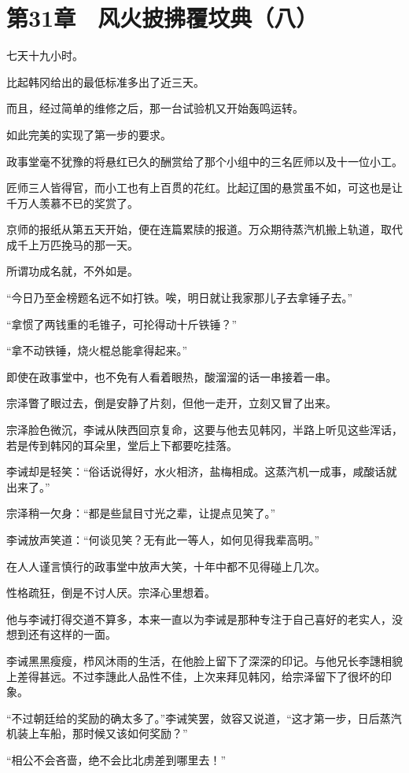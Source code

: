\section{第31章　风火披拂覆坟典（八）}

七天十九小时。

比起韩冈给出的最低标准多出了近三天。

而且，经过简单的维修之后，那一台试验机又开始轰鸣运转。

如此完美的实现了第一步的要求。

政事堂毫不犹豫的将悬红已久的酬赏给了那个小组中的三名匠师以及十一位小工。

匠师三人皆得官，而小工也有上百贯的花红。比起辽国的悬赏虽不如，可这也是让千万人羡慕不已的奖赏了。

京师的报纸从第五天开始，便在连篇累牍的报道。万众期待蒸汽机搬上轨道，取代成千上万匹挽马的那一天。

所谓功成名就，不外如是。

“今日乃至金榜题名远不如打铁。唉，明日就让我家那儿子去拿锤子去。”

“拿惯了两钱重的毛锥子，可抡得动十斤铁锤？”

“拿不动铁锤，烧火棍总能拿得起来。”

即使在政事堂中，也不免有人看着眼热，酸溜溜的话一串接着一串。

宗泽瞥了眼过去，倒是安静了片刻，但他一走开，立刻又冒了出来。

宗泽脸色微沉，李诫从陕西回京复命，这要与他去见韩冈，半路上听见这些浑话，若是传到韩冈的耳朵里，堂后上下都要吃挂落。

李诫却是轻笑：“俗话说得好，水火相济，盐梅相成。这蒸汽机一成事，咸酸话就出来了。”

宗泽稍一欠身：“都是些鼠目寸光之辈，让提点见笑了。”

李诫放声笑道：“何谈见笑？无有此一等人，如何见得我辈高明。”

在人人谨言慎行的政事堂中放声大笑，十年中都不见得碰上几次。

性格疏狂，倒是不讨人厌。宗泽心里想着。

他与李诫打得交道不算多，本来一直以为李诫是那种专注于自己喜好的老实人，没想到还有这样的一面。

李诫黑黑瘦瘦，栉风沐雨的生活，在他脸上留下了深深的印记。与他兄长李譓相貌上差得甚远。不过李譓此人品性不佳，上次来拜见韩冈，给宗泽留下了很坏的印象。

“不过朝廷给的奖励的确太多了。”李诫笑罢，敛容又说道，“这才第一步，日后蒸汽机装上车船，那时候又该如何奖励？”

“相公不会吝啬，绝不会比北虏差到哪里去！”

